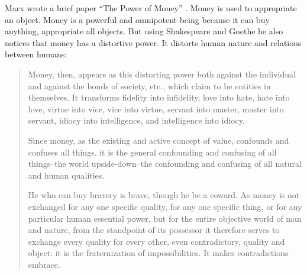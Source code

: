 \documentclass[10pt, letterpaper]{article}
\begin{document}
\begin{spacing}{1.8}
%

Marx wrote a brief paper ``The Power of Money'' \citep{marx1844-powerOfMoney}. Money is used to appropriate an object. Money is a
powerful and omnipotent being because it can buy anything, appropriate all objects.
But using Shakespeare and Goethe he also notices that money has a
distortive power. It distorts human nature and relations between humans:
\begin{quote}
Money, then, appears as this distorting power both against the individual and against the bonds of society, etc., which claim to be entities in themselves. It transforms fidelity into infidelity, love into hate, hate into love, virtue into vice, vice into virtue, servant into master, master into servant, idiocy into intelligence, and intelligence into idiocy.

Since money, as the existing and active concept of value, confounds and confuses all things, it is the general confounding and confusing of all things--the world upside-down--the confounding and confusing of all natural and human qualities.

He who can buy bravery is brave, though he be a coward. As money is not exchanged for any one specific quality, for any one specific thing, or for any particular human essential power, but for the entire objective world of man and nature, from the standpoint of its possessor it therefore serves to exchange every quality for every other, even contradictory, quality and object: it is the fraternization of impossibilities. It makes contradictions embrace.


\end{quote}
\end{spacing}
\end{document}
